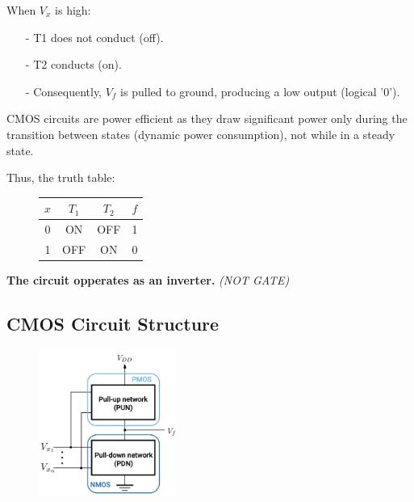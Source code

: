 \documentclass[12pt,openany]{book}
\begin{document}
			      	When \( V_x \) is high:
			      	\begin{itemize}
			      		\item[-] T1 does not conduct (off).
			      		\item[-] T2 conducts (on).
			      		\item[-] Consequently, \( V_f \) is pulled to ground, producing a low output (logical '0').
			      	\end{itemize}
			      	  
			      	CMOS circuits are power efficient as they draw significant power only during the transition between states (dynamic power consumption), not while in a steady state.
			      	  
			      	\vspace*{10px}
			      	
			      	Thus, the truth table:
			      	\begin{figure}[h]
			      		\centering
			      		\begin{tabular}{c|c|c|c}
			      			\( x \) & \( T_1 \) & \( T_2 \) & \( f \) \\
			      			\hline
			      			0       & ON        & OFF       & 1       \\
			      			1       & OFF       & ON        & 0       \\
			      		\end{tabular}
			      	\end{figure}
			      	
			      	
			      	\textbf{The circuit opperates as an inverter. } \textit{(NOT GATE)}
			      	
			      	\newpage
			      	\subsection{CMOS Circuit Structure}
			      	\begin{figure}[h]
			      		\centering
			      		\includegraphics[width=0.4\textwidth]{circuits/9.1.4.png} %
			      	\end{figure}
			      	
\end{document}
